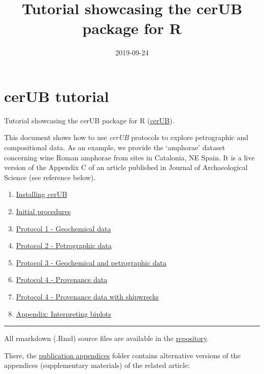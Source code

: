 \documentclass[12pt,]{book}
\title{Tutorial showcasing the cerUB package for R}
\author{}
\date{2019-09-24}
\providecommand{\tightlist}{%
  \setlength{\itemsep}{0pt}\setlength{\parskip}{0pt}}
\begin{document}
\maketitle

{
\hypersetup{linkcolor=black}
\setcounter{tocdepth}{1}
\tableofcontents
}
\hypertarget{cerub-tutorial}{%
\chapter*{cerUB tutorial}\label{cerub-tutorial}}

Tutorial showcasing the cerUB package for R (\href{https://github.com/Andros-Spica/cerUB}{cerUB}).

This document shows how to use \emph{cerUB} protocols to explore petrographic and compositional data. As an example, we provide the `amphorae' dataset concerning wine Roman amphorae from sites in Catalonia, NE Spain. It is a live version of the Appendix C of an article published in Journal of Archaeological Science (see reference below).

\begin{enumerate}
\def\labelenumi{\arabic{enumi}.}
\tightlist
\item
  \protect\hyperlink{install}{Installing cerUB}
\item
  \protect\hyperlink{init}{Initial procedures}
\item
  \protect\hyperlink{prot1}{Protocol 1 - Geochemical data}
\item
  \protect\hyperlink{prot2}{Protocol 2 - Petrographic data}
\item
  \protect\hyperlink{prot3}{Protocol 3 - Geochemical and petrographic data}
\item
  \protect\hyperlink{prot4}{Protocol 4 - Provenance data}
\item
  \protect\hyperlink{prot4_ship}{Protocol 4 - Provenance data with shipwrecks}
\item
  \protect\hyperlink{interp_biplots}{Appendix: Interpreting biplots}
\end{enumerate}

\begin{center}\rule{0.5\linewidth}{\linethickness}\end{center}

All rmarkdown (.Rmd) source files are available in the \href{https://github.com/Andros-Spica/cerUB_tutorial}{repository}.

There, the \href{https://github.com/Andros-Spica/cerUB_tutorial/tree/master/publication_appendices}{publication appendices} folder contains alternative versions of the appendices (supplementary materials) of the related article:
\end{document}
